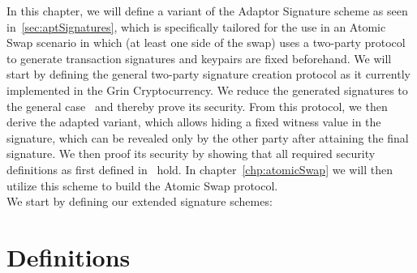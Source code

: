 In this chapter, we will define a variant of the Adaptor Signature scheme as seen in~\ref{sec:aptSignatures},
which is specifically tailored for the use in an Atomic Swap scenario in which (at least one side of the swap) uses a two-party protocol to generate transaction signatures and keypairs are fixed beforehand.
We will start by defining the general two-party signature creation protocol as it currently implemented in the Grin Cryptocurrency.
We reduce the generated signatures to the general case~\cite{schnorr1989efficient} and thereby prove its security. From this protocol, we then derive the adapted variant, which allows hiding a fixed witness
value in the signature, which can be revealed only by the other party after attaining the final signature.
We then proof its security by showing that all required security definitions as first defined in~\cite{aumayr2020bitcoinchannels} hold.
In chapter~\ref{chp:atomicSwap} we will then utilize this scheme to build the Atomic Swap protocol.
\\
We start by defining our extended signature schemes:\\

\section{Definitions}

